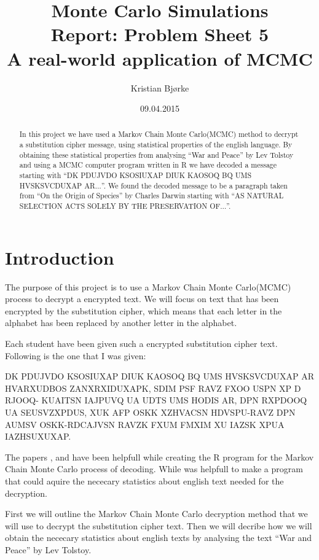 \documentclass[a4paper, 11pt]{article}
\title{Monte Carlo Simulations \\
Report: Problem Sheet 5 \\ A real-world application of MCMC}
\author{Kristian Bjørke}
\date{09.04.2015}
\begin{document}
\maketitle

\begin{abstract}
  In this project we have used a Markov Chain Monte Carlo(MCMC) method to
  decrypt a substitution cipher message, using statistical properties 
  of the english language. By obtaining these statistical properties 
  from analysing ``War and Peace'' by Lev Tolstoy and using a MCMC 
  computer program written in R we have  decoded a message starting with 
  ``DK PDUJVDO KSOSIUXAP DIUK  KAOSOQ BQ UMS HVSKSVCDUXAP AR$\dots$''. 
  We found the decoded message to be a paragraph taken from ``On the 
  Origin of Species'' by Charles Darwin starting with ``AS NATURAL 
  SELECTION ACTS SOLELY BY THE PRESERVATION OF$\dots$''.
\end{abstract}


\section{Introduction}

The purpose of this project is to use a Markov Chain Monte Carlo(MCMC) 
process to decrypt a encrypted text. We will focus on text that has been 
encrypted by the substitution cipher, which means that each letter in 
the alphabet has been replaced by another letter in the alphabet.

Each student have been given such a encrypted substitution cipher text.
Following is the one that I was given:

DK PDUJVDO KSOSIUXAP DIUK KAOSOQ BQ UMS HVSKSVCDUXAP AR
HVARXUDBOS ZANXRXIDUXAPK, SDIM PSF RAVZ FXOO USPN XP D RJOOQ-
KUAITSN IAJPUVQ UA UDTS UMS HODIS AR, DPN RXPDOOQ UA SEUSVZXPDUS, XUK
AFP OSKK XZHVACSN HDVSPU-RAVZ DPN AUMSV OSKK-RDCAJVSN RAVZK FXUM
FMXIM XU IAZSK XPUA IAZHSUXUXAP.

The papers \cite{Diaconis}, \cite{Chen} and \cite{Kocmanek} have been helpfull
while creating the R program for the Markov Chain Monte Carlo process of
decoding. While \cite{Landgraf} was helpfull to make a program that could
aquire the nececary statistics about english text needed for the decryption.

First we will outline the Markov Chain Monte Carlo decryption method that
we will use to decrypt the substitution cipher text. Then we will decribe how
we will obtain the nececary statistics about english texts by analysing the
text ``War and Peace'' by Lev Tolstoy.
\end{document}
